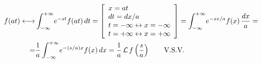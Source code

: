 \begin{task}{3.2}
	\begin{align*}
	f(at)\longleftrightarrow
	&\int_{-\infty}^{+\infty}\! e^{-st}f(at) \, dt=
	\left[\begin{array}{l}
	x=at \\
	dt=dx/a \\
	t=-\infty\leftrightarrow x=-\infty \\
	t=+\infty\leftrightarrow x=+\infty
	\end{array}\right] =
	\int_{-\infty}^{+\infty}\! e^{-sx/a}f(x) \, \frac{dx}{a}= \\ =
	&\frac{1}{a}\int_{-\infty}^{+\infty}\! e^{-(s/a)x}f(x) \, dx=
	\frac{1}{a}\operatorname{\mathcal{L}} f\left(\frac{s}{a}\right)\text{\qquad V.S.V.}
	\end{align*}
\end{task}